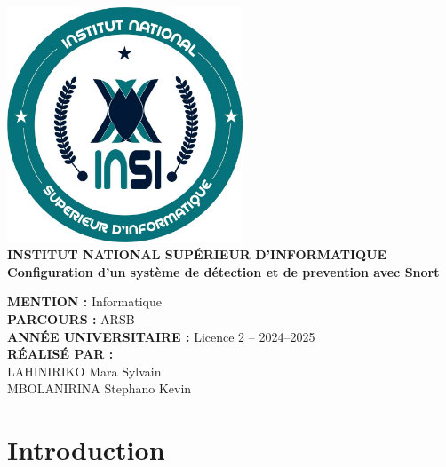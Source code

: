 \documentclass[12pt]{article}
\title{\textbf{}}
\author{}
\author{}
\date{}
\begin{document}
\begin{titlepage}
    \centering
    \vspace*{1cm}
    
    \includegraphics[width=7cm]{captures/285806862_133769749266390_5860943595045476590_n.jpg}\\[1cm] %

    {\Large \textbf{INSTITUT NATIONAL SUPÉRIEUR D’INFORMATIQUE}}\\[1cm]

    {\LARGE \textbf{Configuration d'un système de détection et de prevention avec Snort}}\\[2cm]

    \begin{flushleft}
        \textbf{MENTION :} Informatique\\[0.5cm]
        \textbf{PARCOURS :} ARSB\\[0.5cm]
        \textbf{ANNÉE UNIVERSITAIRE :} Licence 2 – 2024–2025\\[0.5cm]
        \textbf{RÉALISÉ PAR :}\\
        LAHINIRIKO Mara Sylvain\\
        MBOLANIRINA Stephano Kevin
    \end{flushleft}

    \vfill
\end{titlepage}
\maketitle

\section*{Introduction}
\end{document}

